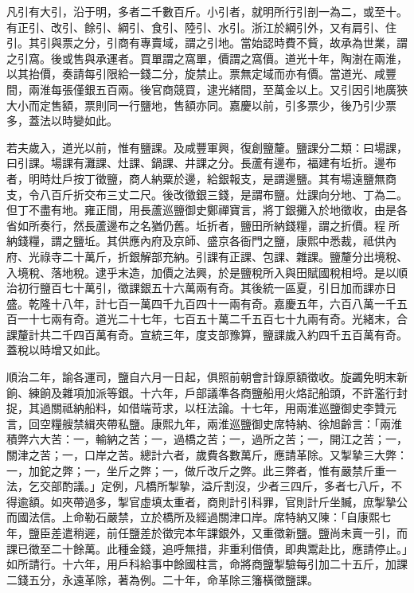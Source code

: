 \begin{pinyinscope}
凡引有大引，沿于明，多者二千數百斤。小引者，就明所行引剖一為二，或至十。有正引、改引、餘引、綱引、食引、陸引、水引。浙江於綱引外，又有肩引、住引。其引與票之分，引商有專賣域，謂之引地。當始認時費不貲，故承為世業，謂之引窩。後或售與承運者。買單謂之窩單，價謂之窩價。道光十年，陶澍在兩淮，以其抬價，奏請每引限給一錢二分，旋禁止。票無定域而亦有價。當道光、咸豐間，兩淮每張僅銀五百兩。後官商競買，逮光緒間，至萬金以上。又引因引地廣狹大小而定售額，票則同一行鹽地，售額亦同。嘉慶以前，引多票少，後乃引少票多，蓋法以時變如此。

若夫歲入，道光以前，惟有鹽課。及咸豐軍興，復創鹽釐。鹽課分二類：曰場課，曰引課。場課有灘課、灶課、鍋課、井課之分。長蘆有邊布，福建有坵折。邊布者，明時灶戶按丁徵鹽，商人納粟於邊，給銀報支，是謂邊鹽。其有場遠鹽無商支，令八百斤折交布三丈二尺。後改徵銀三錢，是謂布鹽。灶課向分地、丁為二。但丁不盡有地。雍正間，用長蘆巡鹽御史鄭禪寶言，將丁銀攤入於地徵收，由是各省如所奏行，然長蘆邊布之名猶仍舊。坵折者，鹽田所納錢糧，謂之折價。程所納錢糧，謂之鹽坵。其供應內府及京師、盛京各衙門之鹽，康熙中悉裁，祗供內府、光祿寺二十萬斤，折銀解部充納。引課有正課、包課、雜課。鹽釐分出境稅、入境稅、落地稅。逮乎末造，加價之法興，於是鹽稅所入與田賦國稅相埒。是以順治初行鹽百七十萬引，徵課銀五十六萬兩有奇。其後統一區夏，引日加而課亦日盛。乾隆十八年，計七百一萬四千九百四十一兩有奇。嘉慶五年，六百八萬一千五百一十七兩有奇。道光二十七年，七百五十萬二千五百七十九兩有奇。光緒末，合課釐計共二千四百萬有奇。宣統三年，度支部豫算，鹽課歲入約四千五百萬有奇。蓋稅以時增又如此。

順治二年，諭各運司，鹽自六月一日起，俱照前朝會計錄原額徵收。旋蠲免明末新餉、練餉及雜項加派等銀。十六年，戶部議準各商鹽船用火烙記船頭，不許濫行封捉，其過關祗納船料，如借端苛求，以枉法論。十七年，用兩淮巡鹽御史李贊元言，回空糧艘禁緝夾帶私鹽。康熙九年，兩淮巡鹽御史席特納、徐旭齡言：「兩淮積弊六大苦：一，輸納之苦；一，過橋之苦；一，過所之苦；一，開江之苦；一，關津之苦；一，口岸之苦。總計六者，歲費各數萬斤，應請革除。又掣摯三大弊：一，加鉈之弊；一，坐斤之弊；一，做斤改斤之弊。此三弊者，惟有嚴禁斤重一法，乞交部酌議。」定例，凡橋所掣摯，溢斤割沒，少者三四斤，多者七八斤，不得逾額。如夾帶過多，掣官虛填太重者，商則計引科罪，官則計斤坐贓，庶掣摯公而國法信。上命勒石嚴禁，立於橋所及經過關津口岸。席特納又陳：「自康熙七年，鹽臣差遣稍遲，前任鹽差於徵完本年課銀外，又重徵新鹽。鹽尚未賣一引，而課已徵至二十餘萬。此種金錢，追呼無措，非重利借債，即典鬻赴比，應請停止。」如所請行。十六年，用戶科給事中餘國柱言，命將商鹽掣驗每引加二十五斤，加課二錢五分，永遠革除，著為例。二十年，命革除三籓橫徵鹽課。


\end{pinyinscope}
